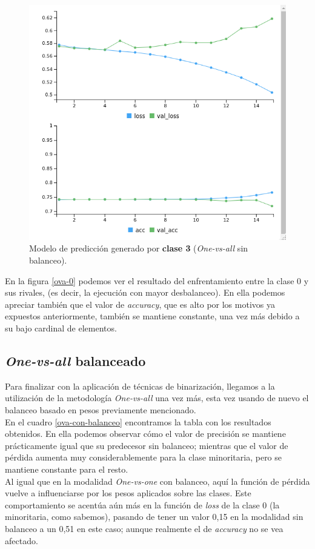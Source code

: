 \documentclass[]{article}
\begin{document}
		\begin{figure}[h]
			\centering
			\includegraphics[width=0.6\columnwidth]{./img/OVA_3}
			\caption{Modelo de predicción generado por \textbf{clase 3} (\textit{One-vs-all} sin balanceo).}
			\label{ova-2}
		\end{figure}
	
		En la figura \ref{ova-0} podemos ver el resultado del enfrentamiento entre la clase 0 y sus rivales, (es decir, la ejecución con mayor desbalanceo). En ella podemos apreciar también que el valor de \textit{accuracy}, que es alto por los motivos ya expuestos anteriormente, también se mantiene constante, una vez más debido a su bajo cardinal de elementos.\\
	
	\subsection{\textit{One-vs-all} balanceado}
	
		Para finalizar con la aplicación de técnicas de binarización, llegamos a la utilización de la metodología \textit{One-vs-all} una vez más, esta vez usando de nuevo el balanceo basado en pesos previamente mencionado.\\
		
		En el cuadro \ref{ova-con-balanceo} encontramos la tabla con los resultados obtenidos. En ella podemos observar cómo el valor de precisión se mantiene prácticamente igual que su predecesor sin balanceo; mientras que el valor de pérdida aumenta muy considerablemente para la clase minoritaria, pero se mantiene constante para el resto.\\
		
		Al igual que en la modalidad \textit{One-vs-one} con balanceo, aquí la función de pérdida vuelve a influenciarse por los pesos aplicados sobre las clases. Este comportamiento se acentúa aún más en la función de \textit{loss} de la clase 0 (la minoritaria, como sabemos), pasando de tener un valor 0,15 en la modalidad sin balanceo a un 0,51 en este caso; aunque realmente el de \textit{accuracy} no se vea afectado.\\
	
\end{document}
